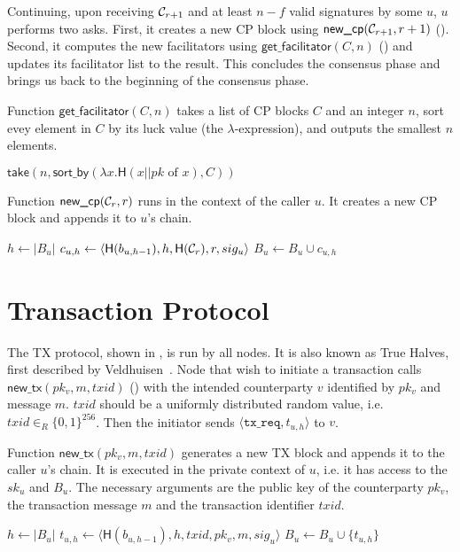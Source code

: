 Continuing, upon receiving $\mathcal{C}_{r + 1}$ and at least $n - f$ valid signatures by some $u$, $u$ performs two asks.
First, it creates a new CP block using $\textsf{new\_cp}(\mathcal{C}_{r + 1}, r + 1)$ ().
Second, it computes the new facilitators using $\textsf{get\_facilitator}(C, n)$ ()
and updates its facilitator list to the result.
This concludes the consensus phase and brings us back to the beginning of the consensus phase.

\begin{algorithm}
\caption{Function $\textsf{get\_facilitator}(C, n)$ takes a list of CP blocks $C$ and an integer $n$,
sort evey element in $C$ by its luck value (the $\lambda$-expression), and outputs the smallest $n$ elements.}
\label{alg:facilitator}
\begin{algorithmic}
\State $\textsf{take} (n, \textsf{sort\_by} (\lambda x.\textsf{H}(x || pk \text{ of } x), C))$
\end{algorithmic}
\end{algorithm}

\begin{algorithm}
\caption{Function $\textsf{new\_cp}(\mathcal{C}_r, r)$ runs in the context of the caller $u$.
It creates a new CP block and appends it to $u$'s chain.}
\label{alg:new-cp}
\begin{algorithmic}
\State $h \gets |B_u|$
\State $c_{u, h} \gets \langle \textsf{H}(b_{u, h-1}), h, \textsf{H}(\mathcal{C}_r), r, sig_u \rangle$
\State $B_u \gets B_u \cup c_{u, h}$
\end{algorithmic}
\end{algorithm}

\section{Transaction Protocol}
\label{sec:tx-protocol}

The TX protocol, shown in , is run by all nodes.
It is also known as True Halves, first described by Veldhuisen~\cite[Chapter~3.2]{truehalves}.
Node that wish to initiate a transaction calls $\textsf{new\_tx}(pk_v, m, txid)$ () with the intended counterparty $v$ identified by $pk_v$ and message $m$.
$txid$ should be a uniformly distributed random value, i.e. $txid \in_R \{0, 1\}^{256}$.
Then the initiator sends $\langle \texttt{tx\_req}, t_{u, h}\rangle$ to $v$.

\begin{algorithm}
    \caption{Function $\textsf{new\_tx}(pk_v, m, txid)$ generates a new TX block and appends it to the caller $u$'s chain.
    It is executed in the private context of $u$, i.e. it has access to the $sk_u$ and $B_u$.
    The necessary arguments are the public key of the counterparty $pk_v$, the transaction message $m$ and the transaction identifier $txid$.}
    \label{alg:new-tx}

    \begin{algorithmic}
    \State $h \gets |B_u|$
    \State $t_{u, h} \gets \langle \textsf{H}(b_{u, h - 1}), h, txid, pk_v, m, sig_u \rangle$
    \State $B_u \gets B_u \cup \{ t_{u, h} \}$
    \end{algorithmic}
\end{algorithm}

